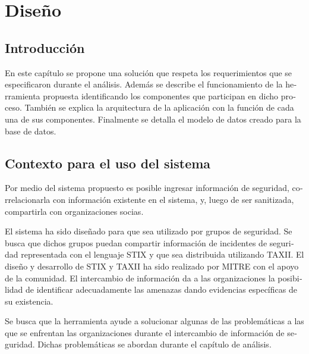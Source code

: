 \makeatother
\setlength\tabcolsep{1mm}
\renewcommand\arraystretch{1.3}
\renewcommand\theFigura{\arabic{FiguraCap4}}
\renewcommand\theTabla{\arabic{TablaCap4}}

\chapter{Diseño}
\label{capitulo4}
	\section[Introducción]{\foreignlanguage{spanish}{Introducción}}
	\foreignlanguage{spanish}{En este capítulo se propone una solución que respeta los requerimientos que se especificaron
		durante el análisis. Además se describe el funcionamiento de la herramienta propuesta identificando los componentes que
		participan en dicho proceso. También se explica la arquitectura de la aplicación con la función de cada una de sus
		componentes. Finalmente se detalla el modelo de datos creado para la base de datos.}
	
	\section[Contexto para el uso del sistema\ \ ]{\foreignlanguage{spanish}{Contexto para el uso del sistema\ \ }}
	\foreignlanguage{spanish}{Por medio del sistema propuesto es posible ingresar información de seguridad, correlacionarla
		con información existente en el sistema, y, luego de ser sanitizada, compartirla con organizaciones socias.}
	
	
	\bigskip
	
	\foreignlanguage{spanish}{El sistema ha sido diseñado para que sea utilizado por grupos de seguridad. Se busca que
		dichos grupos puedan compartir información de incidentes de seguridad representada con el lenguaje STIX y que sea
		distribuida utilizando TAXII. El diseño y desarrollo de STIX y TAXII ha sido realizado por MITRE con el apoyo de la
		comunidad. El intercambio de información da a las organizaciones la posibilidad de identificar adecuadamente las
		amenazas dando evidencias específicas de su existencia.}
	
	
	\bigskip
	
	\foreignlanguage{spanish}{Se busca que la herramienta ayude a solucionar algunas de las problemáticas a las que se
		enfrentan las organizaciones durante el intercambio de información de seguridad. Dichas problemáticas se abordan
		durante el capítulo de análisis.}
	
